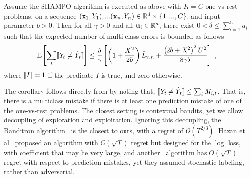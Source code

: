 \begin{corollary}
Assume the SHAMPO algorithm is executed as above with $K=C$ one-vs-rest problems, on a 
sequence $(\mathbf{x}_1,Y_1),...(\mathbf{x}_n,Y_n)\in\mathbb{R}^d\times\{1,...,C\}$, and input parameter $b>0$. 
Then for all $\gamma>0$ and all $\mathbf{u}_{i}\in\mathbb{R}^d$, there exist 
$0<\delta\le \sum_{i=1}^Ca_{i}$ such that the expected number of multi-class errors is bounded as follows
\[
\mathbb{E}\left[{\sum_t [\![{Y_t \neq \hat{Y}_t}]\!]}\right]\le \frac{\delta}{\gamma}\left[{\left(1+\frac{X^2}{2b} \right){\bar L}_{\gamma,n}+
\frac{\left({2b+X^2}\right)^2U^2}{8{\gamma}b}}\right]~,
\]
where $[\![{I}]\!]=1$ if the predicate $I$ is true, and zero otherwise.
\end{corollary}
The corollary follows directly from  by noting that, 
$[\![{Y_t \neq \hat{Y}_t}]\!] \leq \sum_i M_{i,t}$. That is, there is a multiclass mistake if there is at least one 
prediction mistake of one of the one-vs-rest problems. The closest setting is contextual bandits, yet we 
allow decoupling of exploration and exploitation. Ignoring this decoupling, the 
Banditron algorithm~\cite{kakade2008efficient} is the closest to ours, 
with a regret of $O(T^{2/3})$. Hazan et al~\cite{hazan2011newtron} proposed an algorithm 
with $O(\sqrt{T})$ regret but designed for the $\log$ loss, with coefficient that may be very large, and 
another~\cite{DBLP:journals/ml/CrammerG13} algorithm has $O(\sqrt{T})$ regret with respect to prediction 
mistakes, yet they assumed stochastic labeling, rather than adversarial.


